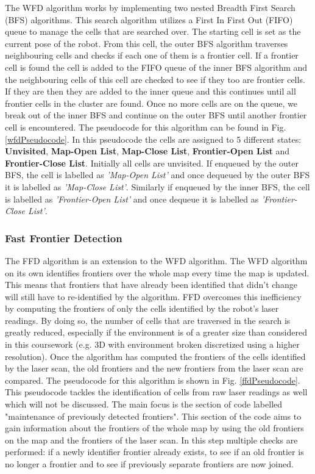\documentclass[a4paper,12pt]{article}
\begin{document}
				The WFD algorithm works by implementing two nested Breadth First Search (BFS) algorithms. This search algorithm utilizes a First In First Out (FIFO) queue to manage the cells that are searched over. The starting cell is set as the current pose of the robot. From this cell, the outer BFS algorithm traverses neighbouring cells and checks if each one of them is a frontier cell. If a frontier cell is found the cell is added to the FIFO queue of the inner BFS algorithm and the neighbouring cells of this cell are checked to see if they too are frontier cells. If they are then they are added to the inner queue and this continues until all frontier cells in the cluster are found. Once no more cells are on the queue, we break out of the inner BFS and continue on the outer BFS until another frontier cell is encountered. The pseudocode for this algorithm can be found in Fig. \ref{wfdPseudocode}. In this pseudocode the cells are assigned to 5 different states: \textbf{Unvisited}, \textbf{Map-Open List}, \textbf{Map-Close List}, \textbf{Frontier-Open List} and \textbf{Frontier-Close List}. Initially all cells are unvisited. If enqueued by the outer BFS, the cell is labelled as \textit{'Map-Open List'} and once dequeued by the outer BFS it is labelled as \textit{'Map-Close List'}. Similarly if enqueued by the inner BFS, the cell is labelled as \textit{'Frontier-Open List'} and once dequeue it is labelled as \textit{'Frontier-Close List'}. 
				
				\subsubsection{Fast Frontier Detection}

				The FFD algorithm is an extension to the WFD algorithm. The WFD algorithm on its own identifies frontiers over the whole map every time the map is updated. This means that frontiers that have already been identified that didn't change will still have to re-identified by the algorithm. FFD overcomes this inefficiency by computing the frontiers of only the cells identified by the robot's laser readings. By doing so, the number of cells that are traversed in the search is greatly reduced, especially if the environment is of a greater size than considered in this coursework (e.g. 3D with environment broken discretized using a higher resolution). Once the algorithm has computed the frontiers of the cells identified by the laser scan, the old frontiers and the new frontiers from the laser scan are compared. The pseudocode for this algorithm is shown in Fig. \ref{ffdPseudocode}. This pseudocode tackles the identification of cells from raw laser readings as well which will not be discussed. The main focus is the section of code labelled "maintenance of previously detected frontiers". This section of the code aims to gain information about the frontiers of the whole map by using the old frontiers on the map and the frontiers of the laser scan. In this step multiple checks are performed: if a newly identifier frontier already exists, to see if an old frontier is no longer a frontier and to see if previously separate frontiers are now joined. 
				
\end{document}
